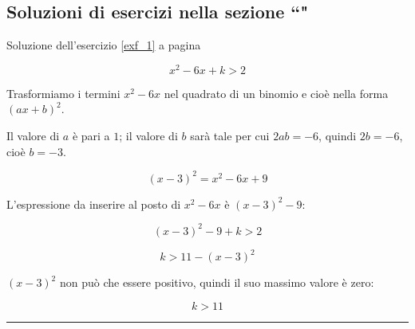 
\subsection{Soluzioni di esercizi nella sezione ``\textbf{}"}

Soluzione dell'esercizio \ref{exf_1} a pagina \pageref{exf_1}\label{solf_1}

\[
x^2 - 6x + k > 2
\]

Trasformiamo i termini $x^2-6x$ nel quadrato di un binomio e cioè nella forma $(ax+b)^2$.

Il valore di $a$ è pari a $1$; il valore di $b$ sarà tale per cui $2ab=-6$, quindi $2b=-6$, cioè $b=-3$.

\[ (x-3)^2=x^2-6x+9 \]

L'espressione da inserire al posto di $x^2 - 6x$ è $(x-3)^2 -9$:

\[ (x-3)^2-9+k>2 \]

\[ k>11-(x-3)^2 \]

$(x-3)^2$ non può che essere positivo, quindi il suo massimo valore è zero:

\[k>11\]


\vspace{1cm}
\hrule
\vspace{1cm}


